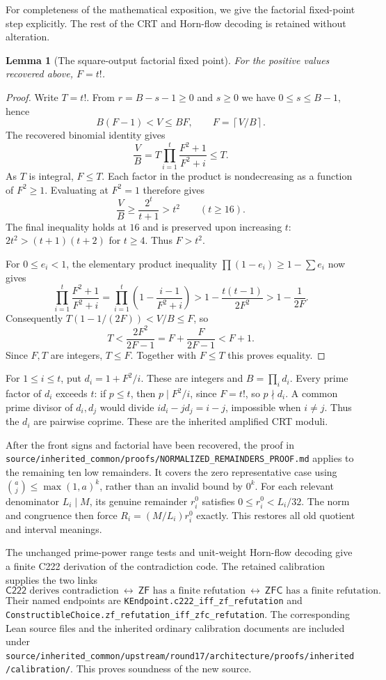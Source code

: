 \documentclass[11pt,letterpaper]{article}
\newtheorem{lemma}[theorem]{Lemma}
\newcommand{\ZFC}{\mathsf{ZFC}}
\newcommand{\ZF}{\mathsf{ZF}}
\newcommand{\Ccal}{\mathsf{C222}}
\newcommand{\file}[1]{\texttt{\nolinkurl{#1}}}
\begin{document}
For completeness of the mathematical exposition, we give the factorial
fixed-point step explicitly. The rest of the CRT and Horn-flow
decoding is retained without alteration.

\begin{lemma}[The square-output factorial fixed point]\label{lem:factorial}
For the positive values recovered above, $F=t!$.
\end{lemma}
\begin{proof}
Write $T=t!$. From $r=B-s-1\ge0$ and $s\ge0$ we have
$0\le s\le B-1$, hence
\[
 B(F-1)<V\le BF,\qquad F=\left\lceil V/B\right\rceil.
\]
The recovered binomial identity gives
\[
 \frac VB
  =T\prod_{i=1}^{t}\frac{F^2+1}{F^2+i}\le T.
\]
As $T$ is integral, $F\le T$. Each factor in the product is
nondecreasing as a function of $F^2\ge1$. Evaluating at $F^2=1$
therefore gives
\[
 \frac VB\ge \frac{2^t}{t+1}>t^2\qquad(t\ge16).
\]
The final inequality holds at $16$ and is preserved upon increasing
$t$: $2t^2>(t+1)(t+2)$ for $t\ge4$.
Thus $F>t^2$.

For $0\le e_i<1$, the elementary product inequality
$\prod(1-e_i)\ge1-\sum e_i$ now gives
\[
 \prod_{i=1}^{t}\frac{F^2+1}{F^2+i}
 =\prod_{i=1}^{t}\left(1-\frac{i-1}{F^2+i}\right)
 >1-\frac{t(t-1)}{2F^2}
 >1-\frac{1}{2F}.
\]
Consequently
$T(1-1/(2F))<V/B\le F$, so
\[
 T<\frac{2F^2}{2F-1}
   =F+\frac{F}{2F-1}<F+1.
\]
Since $F,T$ are integers, $T\le F$. Together with $F\le T$
this proves equality.
\end{proof}

For $1\le i\le t$, put $d_i=1+F^2/i$. These are integers and
$B=\prod_i d_i$. Every prime factor of $d_i$ exceeds $t$:
if $p\le t$, then $p\mid F^2/i$, since $F=t!$, so $p\nmid d_i$.
A common prime divisor of $d_i,d_j$ would divide
$id_i-jd_j=i-j$, impossible when $i\ne j$. Thus the $d_i$ are
pairwise coprime. These are the inherited amplified CRT moduli.

After the front signs and factorial have been recovered, the proof in
\file{source/inherited_common/proofs/NORMALIZED_REMAINDERS_PROOF.md}
applies to the remaining ten low remainders. It covers the zero
representative case using
$\binom aj\le\max(1,a)^k$, rather than an invalid bound by $0^k$.
For each relevant denominator $L_i\mid M$, its genuine remainder
$r_i^0$ satisfies $0\le r_i^0<L_i/32$.
The norm and congruence then force $R_i=(M/L_i)r_i^0$ exactly.
This restores all old quotient and interval meanings.

The unchanged prime-power range tests and unit-weight Horn-flow
decoding give a finite C222 derivation of the contradiction code.
The retained calibration supplies the two links
\[
 \Ccal\text{ derives contradiction}
 \ \longleftrightarrow\
 \ZF\text{ has a finite refutation}
 \ \longleftrightarrow\
 \ZFC\text{ has a finite refutation}.
\]
Their named endpoints are
\file{KEndpoint.c222_iff_zf_refutation} and
\file{ConstructibleChoice.zf_refutation_iff_zfc_refutation}.
The corresponding Lean source files and the inherited ordinary
calibration documents are included under
\file{source/inherited_common/upstream/round17/architecture/proofs/inherited/calibration/}.
This proves soundness of the new source.
\end{document}
